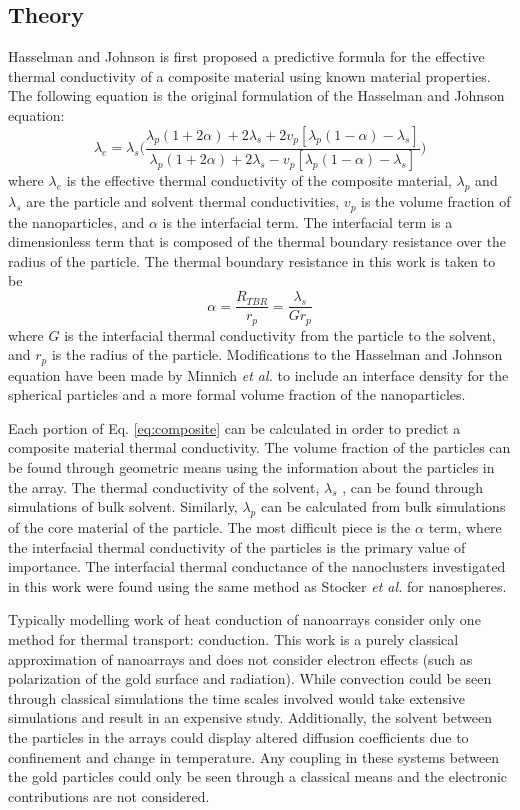 \subsection{Theory}
Hasselman and Johnson is first proposed a predictive formula for the effective thermal conductivity of a composite material using known material properties.\cite{Hasselman}
The following equation is the original formulation of the Hasselman and Johnson equation:
\begin{equation}
\label{eq:composite}
    \lambda_e = \lambda_s \bigg( \frac{\lambda_p (1+2\alpha)+2\lambda_s +2v_p[\lambda_p(1-\alpha)-\lambda_s]}{\lambda_p (1+2\alpha)+2\lambda_s -v_p[\lambda_p(1-\alpha)-\lambda_s]} \bigg)
\end{equation}
where $\lambda_e$ is the effective thermal conductivity of the composite material, $\lambda_p$ and $\lambda_s$ are the particle and solvent thermal conductivities, $v_p$ is the volume fraction of the nanoparticles, and $\alpha$ is the interfacial term.
The interfacial term is a dimensionless term that is composed of the thermal boundary resistance over the radius of the particle.
The thermal boundary resistance in this work is taken to be
\begin{equation}
    \alpha = \frac{R_{TBR}}{r_p} = \frac{\lambda_s}{Gr_p}
\end{equation}
where $G$ is the interfacial thermal conductivity from the particle to the solvent, and $r_p$ is the radius of the particle.
Modifications to the Hasselman and Johnson equation have been made by Minnich \textit{et al.} to include an interface density for the spherical particles and a more formal volume fraction of the nanoparticles.\cite{Minnich2007}

Each portion of Eq. \ref{eq:composite} can be calculated in order to predict a composite material thermal conductivity. 
The volume fraction of the particles can be found through geometric means using the information about the particles in the array.
The thermal conductivity of the solvent, $\lambda_s$ , can be found through simulations of bulk solvent. 
Similarly, $\lambda_p$ can be calculated from bulk simulations of the core material of the particle. 
The most difficult piece is the $\alpha$ term, where the interfacial thermal conductivity of the particles is the primary value of importance.
The interfacial thermal conductance of the nanoclusters investigated in this work were found using the same method as Stocker \textit{et al.} for nanospheres.\cite{Stocker2016}

Typically modelling work of heat conduction of nanoarrays consider only one method for thermal transport: conduction.
This work is a purely classical approximation of nanoarrays and does not consider electron effects (such as polarization of the gold surface and radiation). 
While convection could be seen through classical simulations the time scales involved would take extensive simulations and result in an expensive study. 
Additionally, the solvent between the particles in the arrays could display altered diffusion coefficients due to confinement and change in temperature.
Any coupling in these systems between the gold particles could only be seen through a classical means and the electronic contributions are not considered.

